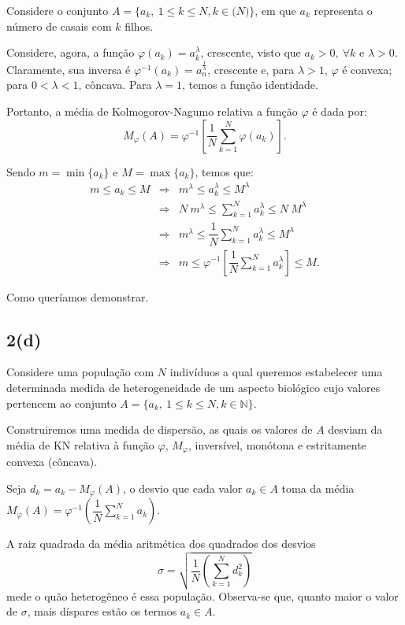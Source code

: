 Considere o conjunto \(A = \{a_k,\ 1 \le k \le N, k \in \mathbb(N)\}\), em que \(a_k\) representa o número de casais com \(k\) filhos.


Considere, agora, a função
\(\varphi(a_k) = a_k^\lambda\), crescente, visto que \(a_k > 0,\ \forall k\) e \(\lambda > 0\). Claramente, sua inversa é \(\varphi^{-1}(a_k) = a_n^{\frac{1}{\lambda}}\), crescente e, para \(\lambda > 1\), \(\varphi\) é convexa; para \(0 < \lambda < 1\), côncava. Para \(\lambda = 1\), temos a função identidade. 

Portanto, a média de Kolmogorov-Nagumo relativa a função \(\varphi\) é dada por:
\[
M_\varphi(A)
= \varphi^{-1}\left[\dfrac{1}{N}\displaystyle\sum_{k=1}^{N} \varphi(a_k)\right].
\]

Sendo \(m = \min\{a_k\}\) e \(M = \max\{a_k\}\), temos que:
\[\begin{array}{rcl}
m \le a_k \le M
&\Rightarrow&
m^\lambda \le a_k^\lambda \le M^\lambda \\[0.5cm]
&\Rightarrow&
N\ m^\lambda \le \displaystyle\sum_{k=1}^{N} a_k^\lambda \le N\ M^\lambda \\[0.5cm]
&\Rightarrow&
m^\lambda \le \dfrac{1}{N} \displaystyle\sum_{k=1}^{N} a_k^\lambda \le M^\lambda \\[0.5cm]
&\Rightarrow&
m \le \varphi^{-1}\left[\dfrac{1}{N} \displaystyle\sum_{k=1}^{N} a_k^\lambda\right] \le M.
\end{array}\]

Como queríamos demonstrar.

\subsection*{2(d)}

Considere uma população com \(N\) indivíduos a qual queremos estabelecer uma determinada medida de heterogeneidade de um aspecto biológico cujo valores pertencem ao conjunto \(A = \{a_k,\ 1 \le k \le N, k \in \mathbb{N}\}\).

Construiremos uma medida de dispersão, as quais os valores de \(A\) desviam da média de KN relativa à função \(\varphi\), \(M_\varphi\), inversível, monótona e estritamente convexa (côncava).

Seja \(d_k = a_k - M_\varphi(A)\), o desvio que cada valor \(a_k \in A\) toma da média \(M_\varphi(A) = \varphi^{-1}\left(\dfrac{1}{N}\displaystyle\sum_{k=1}^{N} a_k\right)\).

A raiz quadrada da média aritmética dos quadrados dos desvios
\[\sigma = \sqrt{\dfrac{1}{N}\left(\displaystyle\sum_{k=1}^{N} d_k^2\right)}\] mede o quão heterogêneo é essa população. Observa-se que, quanto maior o valor de \(\sigma\), mais díspares estão os termos \(a_k \in A\).



